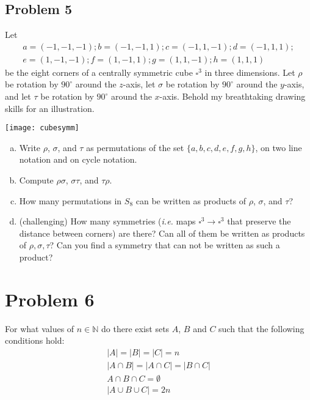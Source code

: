 \documentclass{amsart}
\newcommand{\N}{\mathbb{N}}
\theoremstyle{definition} \newtheorem*{definition}{Definition}
\theoremstyle{remark} \newtheorem*{ex}{Example}
\begin{document}
\subsection*{Problem 5}
Let \begin{align*}a=(-1,-1,-1) ; b=(-1,-1,1) ; c=(-1,1,-1) ; d=(-1,1,1) ; \\ e=(1,-1,-1) ; f=(1,-1,1) ; g=(1,1,-1) ; h=(1,1,1)\end{align*} be the eight corners of a centrally symmetric cube $\square^3$ in three dimensions. Let $\rho$ be rotation by $90^{\circ}$ around the $z$-axis, let $\sigma$ be rotation by $90^{\circ}$ around the $y$-axis, and let $\tau$ be rotation by $90^{\circ}$ around the $x$-axis. Behold my breathtaking drawing skills for an illustration.
\begin{center}
\texttt{[image: cubesymm]}
\end{center}
\begin{enumerate}[a)]
\item Write $\rho$, $\sigma$, and $\tau$ as permutations of the set $\{a,b,c,d,e,f,g,h\}$, on two line notation and on cycle notation.
\item Compute $\rho\sigma$, $\sigma\tau$, and $\tau\rho$.
\item How many permutations in $S_8$ can be written as products of $\rho$, $\sigma$, and $\tau$?
\item (challenging) How many symmetries ({\em i.e.} maps $\square^3\to\square^3$ that preserve the distance between corners) are there? Can all of them be written as products of $\rho, \sigma, \tau$? Can you find a symmetry that can not be written as such a product?
\end{enumerate}

\section*{Problem 6}
For what values of $n\in\N$ do there exist sets $A$, $B$ and $C$ such that the following conditions hold: 
\begin{align*}|A|=|B|=|C|=n\\
|A\cap B|=|A\cap C|=|B\cap C|\\
A\cap B\cap C =\emptyset\\
|A\cup B\cup C|=2n
\end{align*}
\end{document}
